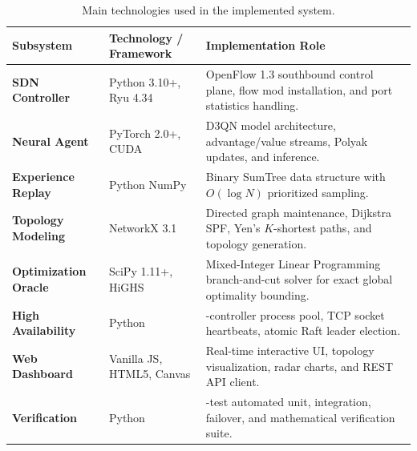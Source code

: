 \documentclass[12pt,a4paper,oneside]{report}
\newcommand{\code}[1]{\texttt{\detokenize{#1}}}
\begin{document}
\begin{table}[htbp]
\centering
\small
\caption{Main technologies used in the implemented system.}
\label{tab:tech_stack}
\begin{tabularx}{\textwidth}{>{\bfseries}p{32mm}>{\raggedright\arraybackslash}p{44mm}>{\raggedright\arraybackslash}X}
\toprule
Subsystem & Technology / Framework & Implementation Role \\
\midrule
SDN Controller & Python 3.10+, Ryu 4.34 & OpenFlow 1.3 southbound control plane, flow mod installation, and port statistics handling. \\
Neural Agent & PyTorch 2.0+, CUDA & D3QN model architecture, advantage/value streams, Polyak updates, and inference. \\
Experience Replay & Python NumPy & Binary SumTree data structure with $O(\log N)$ prioritized sampling. \\
Topology Modeling & NetworkX 3.1 & Directed graph maintenance, Dijkstra SPF, Yen's $K$-shortest paths, and topology generation. \\
Optimization Oracle & SciPy 1.11+, HiGHS & Mixed-Integer Linear Programming branch-and-cut solver for exact global optimality bounding. \\
High Availability & Python \code{multiprocessing} & 3-controller process pool, TCP socket heartbeats, atomic Raft leader election. \\
Web Dashboard & Vanilla JS, HTML5, Canvas & Real-time interactive UI, topology visualization, radar charts, and REST API client. \\
Verification & Python \code{unittest} & 42-test automated unit, integration, failover, and mathematical verification suite. \\
\bottomrule
\end{tabularx}
\end{table}
\end{document}
